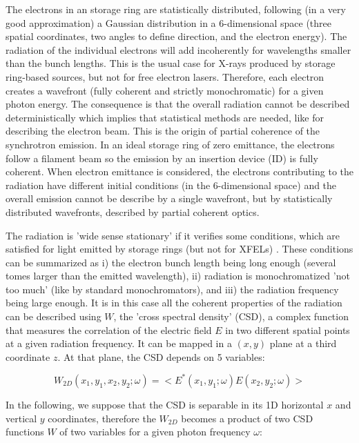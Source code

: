 \documentclass{iucr}              %
\begin{document}
The electrons in an storage ring are statistically distributed, following (in a very good approximation) a Gaussian distribution in a 6-dimensional space (three spatial coordinates, two angles to define direction, and the electron energy). The radiation of the individual electrons will add incoherently for wavelengths smaller than the bunch lengths. This is the usual case for X-rays produced by storage ring-based sources, but not for free electron lasers. Therefore, each electron creates a wavefront (fully coherent and strictly monochromatic) for a given photon energy. The consequence is that the overall radiation cannot be described deterministically which implies that statistical methods are needed, like for describing the electron beam. This is the origin of partial coherence of the synchrotron emission. In an ideal storage ring of zero emittance, the electrons follow a filament beam so the emission by an insertion device (ID) is fully coherent. When electron emittance is considered, the electrons contributing to the radiation have different initial conditions (in the 6-dimensional space) and the overall emission cannot be describe by a single wavefront, but by statistically distributed wavefronts, described by partial coherent optics.

The radiation is 'wide sense stationary' \cite{mandel_wolf} if it verifies some conditions, which are satisfied for light emitted by storage rings (but not for XFELs) \cite{geloni2008}. These conditions can be summarized as
i) the electron bunch length being long enough (several tomes larger than the emitted wavelength),
ii) radiation is monochromatized 'not too much' (like by standard monochromators), and 
iii) the radiation frequency being large enough.
It is in this case all the coherent properties of the radiation can be described using $W$, the 'cross spectral density' (CSD), a complex function that measures the correlation of the electric field $E$ in two different spatial points at a given radiation frequency. It can be mapped in a $(x,y)$ plane at a third coordinate $z$. At that plane, the CSD depends on 5 variables: 

\begin{equation}
W_{2D}(x_1,y_1,x_2,y_2;\omega) = <E^*(x_1,y_1;\omega) E(x_2,y_2;\omega)>
\label{eq:CSD_1D}
\end{equation}

In the following, we suppose that the CSD is separable in its 1D horizontal $x$ and vertical $y$ coordinates, therefore the $W_{2D}$ becomes a product of two CSD functions $W$ of two variables for a given photon frequency $\omega$:
\end{document}
